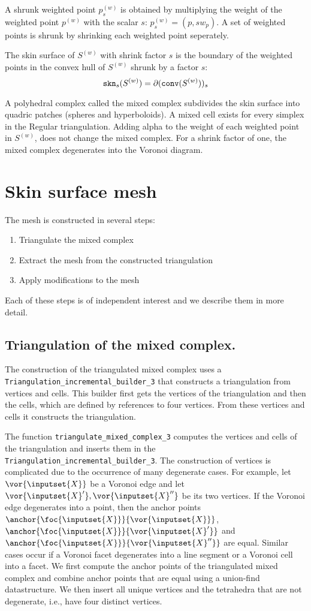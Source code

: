 A shrunk weighted point ${p}^{(w)}_{s}$ is obtained by multiplying the
weight of the weighted point ${p}^{(w)}$ with the scalar $s$:
${p}^{(w)}_{s}= (p,s w_p)$. A set of weighted points is shrunk by
shrinking each weighted point seperately.

The skin surface of ${S}^{(w)}$ with shrink factor $s$ is the boundary
of the weighted points in the convex hull of ${S}^{(w)}$ shrunk by a
factor $s$:
\[{\tt skn}_s({S}^{(w)}) =
\partial({\tt conv}({S}^{(w)}))_s\]

A polyhedral complex called the mixed complex subdivides the skin
surface into quadric patches (spheres and hyperboloids). A mixed cell
exists for every simplex in the Regular triangulation. Adding alpha to
the weight of each weighted point in $S^{(w)}$, does not change the
mixed complex. For a shrink factor of one, the mixed complex
degenerates into the Voronoi diagram.

\section{Skin surface mesh}
The mesh is constructed in several steps:
\begin{enumerate}
\item Triangulate the mixed complex
\item Extract the mesh from the constructed triangulation
\item Apply modifications to the mesh
\end{enumerate}
Each of these steps is of independent interest and we describe them in
more detail.

\subsection{Triangulation of the mixed complex.}
The construction of the triangulated mixed complex uses a
\verb~Triangulation_incremental_builder_3~ that constructs a
triangulation from vertices and cells. This builder first gets the
vertices of the triangulation and then the cells, which are defined by
references to four vertices. From these vertices and cells it
constructs the triangulation.

The function \verb~triangulate_mixed_complex_3~ computes the vertices
and cells of the triangulation and inserts them in the
\verb~Triangulation_incremental_builder_3~. The construction of
vertices is complicated due to the occurrence of many degenerate
cases.  For example, let $\vor{\inputset{X}}$ be a Voronoi edge and
let $\vor{\inputset{X}'}, \vor{\inputset{X}''}$ be its two vertices.
If the Voronoi edge degenerates into a point, then the anchor points
$\anchor{\foc{\inputset{X}}}{\vor{\inputset{X}}}$,
$\anchor{\foc{\inputset{X}}}{\vor{\inputset{X}'}}$ and
$\anchor{\foc{\inputset{X}}}{\vor{\inputset{X}''}}$ are equal. Similar
cases occur if a Voronoi facet degenerates into a line segment or a
Voronoi cell into a facet. We first compute the anchor points of the
triangulated mixed complex and combine anchor points that are equal
using a union-find datastructure. We then insert all unique vertices
and the tetrahedra that are not degenerate, i.e., have four distinct
vertices.

